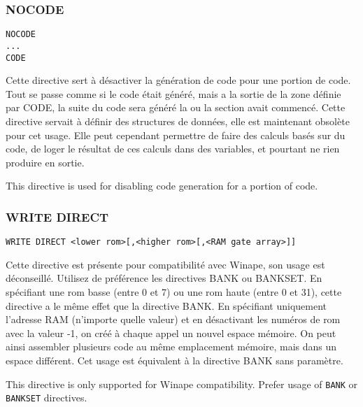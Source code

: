 \subsubsection{NOCODE}
\begin{verbatim}
NOCODE
...
CODE
\end{verbatim}

\begin{xfr}
  Cette directive sert à désactiver la génération de code pour une portion de code. Tout se passe comme si le code était généré, mais a la sortie de la zone définie par CODE, la suite du code sera généré la ou la section avait commencé.
  Cette directive servait à définir des structures de données, elle est maintenant obsolète pour cet usage. Elle peut cependant permettre de faire des calculs basés sur du code, de loger le résultat de ces calculs dans des variables, et pourtant ne rien produire en sortie.
\end{xfr}

\begin{xen}
This directive is used for disabling code generation for a portion of code. 
\end{xen}

\subsubsection{WRITE DIRECT}

\begin{verbatim}
WRITE DIRECT <lower rom>[,<higher rom>[,<RAM gate array>]]
\end{verbatim}

\begin{xfr}
Cette directive est présente pour compatibilité avec Winape, son usage est déconseillé. Utilisez de préférence les directives BANK ou BANKSET.
En spécifiant une rom basse (entre 0 et 7) ou une rom haute (entre 0 et 31), cette directive a le même effet que la directive BANK.
En spécifiant uniquement l'adresse RAM (n'importe quelle valeur) et en désactivant les numéros de rom avec la valeur -1, on créé à chaque appel un nouvel espace mémoire. On peut ainsi assembler plusieurs code au même emplacement mémoire, mais dans un espace différent. Cet usage est équivalent à la directive BANK sans paramètre.

\end{xfr}

\begin{xen}
This directive is only supported for Winape compatibility. Prefer usage of \texttt{BANK} or \texttt{BANKSET} directives.

\end{xen}


